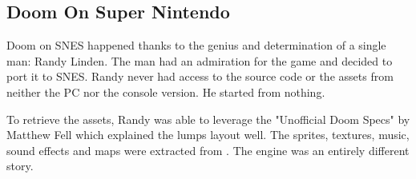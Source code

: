 \pagebreak


\par
{}
















\subsection{Doom On Super Nintendo}

Doom on SNES happened thanks to the genius and determination of a single man: Randy Linden. The man had an admiration for the game and decided to port it to SNES. Randy never had access to the source code or the assets from neither the PC nor the console version. He started from nothing.\\
\par
To retrieve the assets, Randy was able to leverage the "Unofficial Doom Specs" by Matthew Fell which explained the  lumps layout well. The sprites, textures, music, sound effects and maps were extracted from . The engine was an entirely different story.\\
\par

